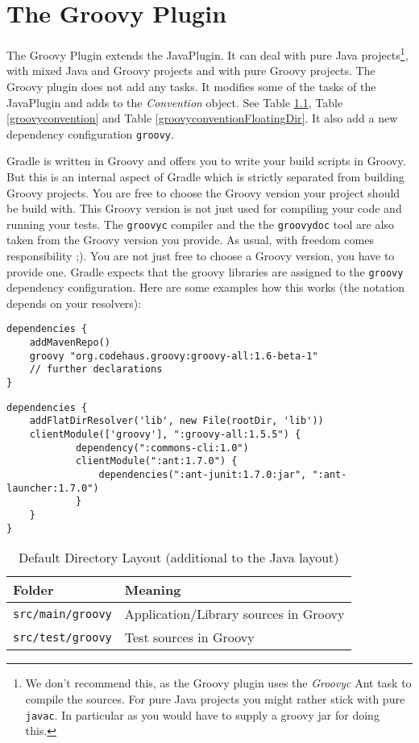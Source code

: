 \chapter{The Groovy Plugin} %
\label{cha:the_groovy_plugin}
The Groovy Plugin extends the JavaPlugin. It can deal with pure Java projects\footnote{We don't recommend this, as the Groovy plugin uses the \emph{Groovyc} Ant task to compile the sources. For pure Java projects you might rather stick with pure \texttt{javac}. In particular as you would have to supply a groovy jar for doing this.}, with mixed Java and Groovy projects and with pure Groovy projects. The Groovy plugin does not add any tasks. It modifies some of the tasks of the JavaPlugin and adds to the \emph{Convention} object. See Table \ref{groovylayout}, Table \ref{groovyconvention} and Table \ref{groovyconventionFloatingDir}. It also add a new dependency configuration \texttt{groovy}. 

Gradle is written in Groovy and offers you to write your build scripts in Groovy. But this is an internal aspect of Gradle which is strictly separated from building Groovy projects. You are free to choose the Groovy version your project should be build with. This Groovy version is not just used for compiling your code and running your tests. The \texttt{groovyc} compiler and the the \texttt{groovydoc} tool are also taken from the Groovy version you provide. As usual, with freedom comes responsibility ;). You are not just free to choose a Groovy version, you have to provide one. Gradle expects that the groovy libraries are assigned to the \texttt{groovy} dependency configuration. Here are some examples how this works (the notation depends on your resolvers):
\begin{Verbatim}
dependencies {
    addMavenRepo()
    groovy "org.codehaus.groovy:groovy-all:1.6-beta-1"
    // further declarations
}	
\end{Verbatim}
\begin{Verbatim}
dependencies {
    addFlatDirResolver('lib', new File(rootDir, 'lib'))
    clientModule(['groovy'], ":groovy-all:1.5.5") {
	        dependency(":commons-cli:1.0")
	        clientModule(":ant:1.7.0") {
	            dependencies(":ant-junit:1.7.0:jar", ":ant-launcher:1.7.0")
	        }
    }
}	
\end{Verbatim}

\begin{table}
	\begin{center}
	\begin{tabular}{|l|l|} \hline
	\textbf{Folder} & \textbf{Meaning} \\ \hline
	\texttt{src/main/groovy} & Application/Library sources in Groovy\\ \hline
	\texttt{src/test/groovy} & Test sources in Groovy \\ \hline
	\end{tabular}
	\end{center}
	\caption{Default Directory Layout (additional to the Java layout)}	
	\label{groovylayout}
\end{table}

